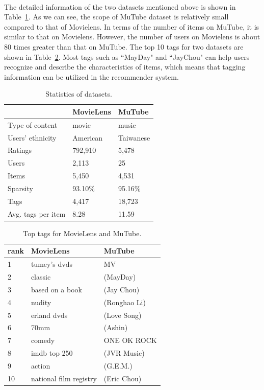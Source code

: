 \documentclass[a4paper,12pt]{report}
\begin{document}
\paragraph{}
The detailed information of the two datasets mentioned above is shown in Table~\ref{tab:datasets}. As we can see, the scope of MuTube dataset is relatively small compared to that of Movielens. In terms of the number of items on MuTube, it is similar to that on Movielens. However, the number of users on Movielens is about 80 times greater than that on MuTube. The top 10 tags for two datasets are shown in Table~\ref{tab:tags}. Most tags such as ``MayDay" and ``JayChou" can help users recognize and describe the characteristics of items, which means that tagging information can be utilized in the recommender system.
\begin{table}[ht]
\caption{Statistics of datasets.}
\label{tab:datasets}
\begin{center}
\begin{tabular}[b]{l l l}
\hline
 & MovieLens & MuTube \\[0.3ex]
\hline
Type of content & movie & music \\[0.3ex]  
Users' ethnicity & American & Taiwanese \\[0.3ex]
Ratings  & 792,910 & 5,478 \\[0.3ex] 
Users & 2,113 & 25 \\[0.3ex]  
Items & 5,450 & 4,531 \\[0.3ex] 
Sparsity  & 93.10\%  & 95.16\% \\[0.3ex] 
Tags  & 4,417 & 18,723 \\[0.3ex] 
Avg. tags per item  & 8.28 & 11.59 \\
\hline
\end{tabular}
\end{center}
\end{table}

\begin{table}[ht]
\caption{Top tags for MovieLens and MuTube.}
\label{tab:tags}
\begin{center}
\begin{tabular}[b]{l l l }
\hline
rank & MovieLens & MuTube\\[0.3ex]
\hline
1 & tumey's dvds & MV \\[0.3ex]  
2 & classic & (MayDay) \\[0.3ex] 
3 & based on a book & (Jay Chou) \\[0.3ex] 
4 & nudity & (Ronghao Li) \\[0.3ex] 
5 & erland dvds & (Love Song) \\[0.3ex] 
6 & 70mm & (Ashin)  \\[0.3ex] 
7 & comedy & ONE OK ROCK  \\[0.3ex] 
8 & imdb top 250  & (JVR Music) \\[0.3ex] 
9 & action & (G.E.M.) \\[0.3ex] 
10& national film registry & (Eric Chou) \\
\hline
\end{tabular}
\end{center}
\end{table}
\end{document}
